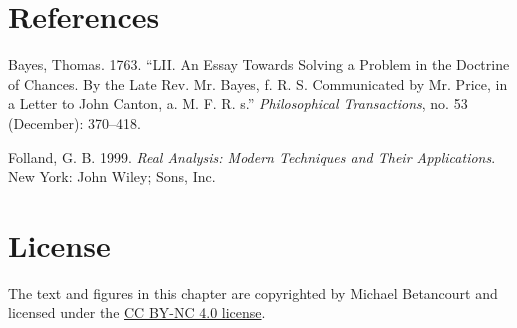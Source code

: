 \documentclass[
  letterpaper,
  DIV=11,
  numbers=noendperiod]{scrartcl}
\newlength{\cslhangindent}
\newenvironment{CSLReferences}[2] %
 {\begin{list}{}{%
  \setlength{\itemindent}{0pt}
  \setlength{\leftmargin}{0pt}
  \setlength{\parsep}{0pt}
  \ifodd #1
   \setlength{\leftmargin}{\cslhangindent}
   \setlength{\itemindent}{-1\cslhangindent}
  \fi
  \setlength{\itemsep}{#2\baselineskip}}}
 {\end{list}}
\begin{document}
\section*{References}\label{references}

\label{refs}
\begin{CSLReferences}{1}{0}
Bayes, Thomas. 1763. {``LII. An Essay Towards Solving a Problem in the
Doctrine of Chances. By the Late Rev. Mr. Bayes, f. R. S. Communicated
by Mr. Price, in a Letter to John Canton, a. M. F. R. s.''}
\emph{Philosophical Transactions}, no. 53 (December): 370--418.

Folland, G. B. 1999. \emph{Real Analysis: Modern Techniques and Their
Applications}. New York: John Wiley; Sons, Inc.

\end{CSLReferences}

\section*{License}\label{license}

The text and figures in this chapter are copyrighted by Michael
Betancourt and licensed under the
\href{https://creativecommons.org/licenses/by-nc/4.0/}{CC BY-NC 4.0
license}.
\end{document}
